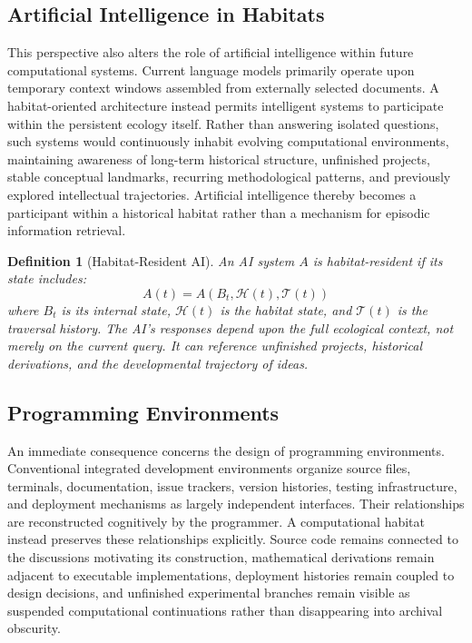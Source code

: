 \documentclass[12pt,oneside]{article}
\newtheorem{definition}{Definition}[section]
\theoremstyle{remark}
\begin{document}
\subsection{Artificial Intelligence in Habitats}

This perspective also alters the role of artificial intelligence within future computational systems. Current language models primarily operate upon temporary context windows assembled from externally selected documents. A habitat-oriented architecture instead permits intelligent systems to participate within the persistent ecology itself. Rather than answering isolated questions, such systems would continuously inhabit evolving computational environments, maintaining awareness of long-term historical structure, unfinished projects, stable conceptual landmarks, recurring methodological patterns, and previously explored intellectual trajectories. Artificial intelligence thereby becomes a participant within a historical habitat rather than a mechanism for episodic information retrieval.

\begin{definition}[Habitat-Resident AI]
An AI system \(A\) is habitat-resident if its state includes:
\[
A(t) = A(B_t, \mathcal{H}(t), \mathcal{T}(t))
\]
where \(B_t\) is its internal state, \(\mathcal{H}(t)\) is the habitat state, and \(\mathcal{T}(t)\) is the traversal history. The AI's responses depend upon the full ecological context, not merely on the current query. It can reference unfinished projects, historical derivations, and the developmental trajectory of ideas.
\end{definition}

\subsection{Programming Environments}

An immediate consequence concerns the design of programming environments. Conventional integrated development environments organize source files, terminals, documentation, issue trackers, version histories, testing infrastructure, and deployment mechanisms as largely independent interfaces. Their relationships are reconstructed cognitively by the programmer. A computational habitat instead preserves these relationships explicitly. Source code remains connected to the discussions motivating its construction, mathematical derivations remain adjacent to executable implementations, deployment histories remain coupled to design decisions, and unfinished experimental branches remain visible as suspended computational continuations rather than disappearing into archival obscurity.
\end{document}
